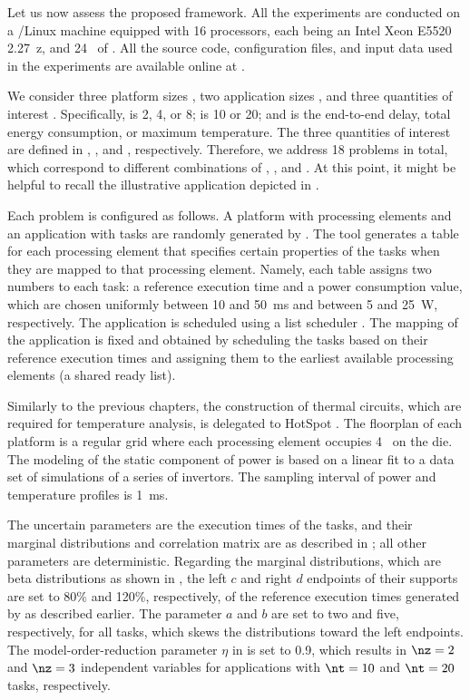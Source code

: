 Let us now assess the proposed framework. All the experiments are conducted on a
/Linux machine equipped with 16 processors, each being an Intel Xeon
E5520 2.27~z, and 24~ of . All the source code,
configuration files, and input data used in the experiments are available online
at \cite{eslab2017a}.

We consider three platform sizes \np, two application sizes \nt, and three
quantities of interest \g. Specifically, \np is 2, 4, or 8; \nt is 10 or 20; and
\g is the end-to-end delay, total energy consumption, or maximum temperature.
The three quantities of interest are defined in ,
, and , respectively. Therefore, we
address 18 problems in total, which correspond to different combinations of \np,
\nt, and \g. At this point, it might be helpful to recall the illustrative
application depicted in .

Each problem is configured as follows. A platform with \np processing elements
and an application with \nt tasks are randomly generated by 
\cite{dick1998}. The tool generates a table for each processing element that
specifies certain properties of the tasks when they are mapped to that
processing element. Namely, each table assigns two numbers to each task: a
reference execution time and a power consumption value, which are chosen
uniformly between 10 and 50~ms and between 5 and 25~W, respectively. The
application is scheduled using a list scheduler \cite{adam1974}. The mapping of
the application is fixed and obtained by scheduling the tasks based on their
reference execution times and assigning them to the earliest available
processing elements (a shared ready list).

Similarly to the previous chapters, the construction of thermal 
circuits, which are required for temperature analysis, is delegated to HotSpot
\cite{skadron2003}. The floorplan of each platform is a regular grid where each
processing element occupies 4~ on the die. The modeling of the
static component of power is based on a linear fit to a data set of 
simulations of a series of  invertors. The sampling interval \dt of
power and temperature profiles is 1~ms.

The uncertain parameters \vu are the execution times of the tasks, and their
marginal distributions and correlation matrix are as described in
; all other parameters are deterministic.
Regarding the marginal distributions, which are beta distributions as shown in
, the left $c$ and right $d$ endpoints of their supports
are set to 80\% and 120\%, respectively, of the reference execution times
generated by  as described earlier. The parameter $a$ and $b$ are set
to two and five, respectively, for all tasks, which skews the distributions
toward the left endpoints. The model-order-reduction parameter $\eta$ in
 is set to 0.9, which results in $\nz = 2$ and $\nz
= 3$ independent variables for applications with $\nt = 10$ and $\nt = 20$
tasks, respectively.

